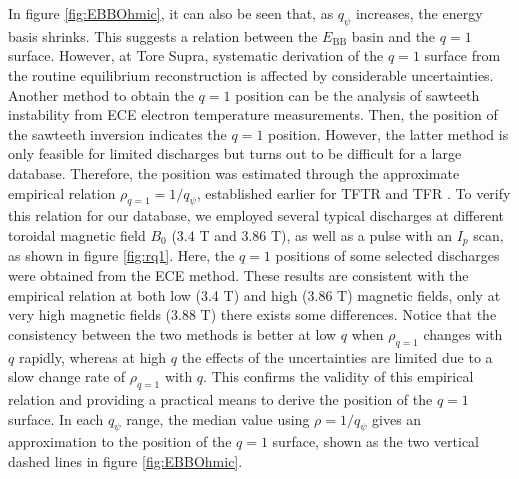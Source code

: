 In figure \ref{fig:EBBOhmic}, it can also be seen that, as $q_{\psi}$ increases, the energy basis shrinks. This suggests a relation between the $E_\mathrm{BB}$ basin and the $q = 1$ surface. However, at Tore Supra, systematic derivation of the $q = 1$ surface from the routine equilibrium reconstruction is affected by considerable uncertainties. Another method to obtain the $q = 1$ position can be the analysis of sawteeth instability from ECE electron temperature measurements. Then, the position of the sawteeth inversion indicates the $q = 1$ position. However, the latter method is only feasible for limited discharges but turns out to be difficult for a large database. Therefore, the position was estimated through the approximate empirical relation $\rho_{q=1} = 1/q_{\psi}$, established earlier for TFTR and TFR \cite{Arunasalam_1990_NF}. To verify this relation for our database, we employed several typical discharges at different toroidal magnetic field $B_{0}$ ($3.4$ T and $3.86$ T), as well as a pulse with an $I_{p}$ scan, as shown in figure \ref{fig:rq1}. Here, the $q = 1$ positions of some selected discharges were obtained from the ECE method. These results are consistent with the empirical relation at both low (3.4 T) and high (3.86 T) magnetic fields, only at very high magnetic fields (3.88 T) there exists some differences. Notice that the consistency between the two methods is better at low $q$ when $\rho_{q=1}$ changes with $q$ rapidly, whereas at high $q$ the effects of the uncertainties are limited due to a slow change rate of $\rho_{q=1}$ with $q$. This confirms the validity of this empirical relation and providing a practical means to derive the position of the $q = 1$ surface. In each $q_{\psi}$ range, the median value using $\rho = 1/q_{\psi}$ gives an approximation to the position of the $q = 1$ surface, shown as the two vertical dashed lines in figure \ref{fig:EBBOhmic}.


